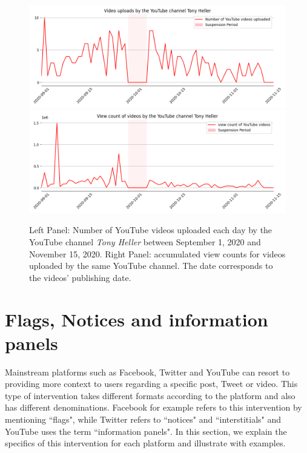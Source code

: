 \documentclass{article}
\begin{document}
\begin{figure}[h]
\hspace{-2em}
			\includegraphics[scale=0.32]{../figure/Tony_Heller_videos_yt.png}
			\includegraphics[scale=0.32]{../figure/Tony_Heller_views_yt.png}
	\caption{Left Panel: Number of YouTube videos uploaded each day by the YouTube channel {\it Tony Heller} between September 1, 2020 and November 15, 2020. Right Panel: accumulated view counts for videos uploaded by the same YouTube channel. The date corresponds to the videos’  publishing date. 
}
	\label{fig1_tony}
\end{figure}


\section{Flags, Notices and information panels} \label{flags}

Mainstream platforms such as Facebook, Twitter and YouTube can resort to providing more context to users regarding a specific post, Tweet or video. This type of intervention takes different formats according to the platform and also has different denominations. Facebook for example refers to this intervention by mentioning ``flags", while Twitter  refers to ``notices" and ``interstitials" and YouTube uses the term ``information panels". In this section, we explain the specifics of this intervention for each platform and illustrate with examples. 
\end{document}
